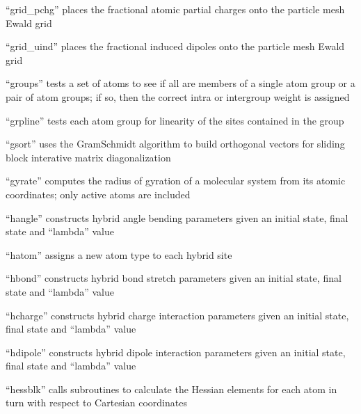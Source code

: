\documentclass[letterpaper,11pt,english]{sphinxmanual}
\begin{document}

“grid\_pchg” places the fractional atomic partial charges onto
the particle mesh Ewald grid


“grid\_uind” places the fractional induced dipoles onto the
particle mesh Ewald grid


“groups” tests a set of atoms to see if all are members of a
single atom group or a pair of atom groups; if so, then the
correct intra\sphinxhyphen{} or intergroup weight is assigned


“grpline” tests each atom group for linearity of the sites
contained in the group


“gsort” uses the Gram\sphinxhyphen{}Schmidt algorithm to build orthogonal
vectors for sliding block interative matrix diagonalization


“gyrate” computes the radius of gyration of a molecular system
from its atomic coordinates; only active atoms are included


“hangle” constructs hybrid angle bending parameters given
an initial state, final state and “lambda” value


“hatom” assigns a new atom type to each hybrid site


“hbond” constructs hybrid bond stretch parameters given
an initial state, final state and “lambda” value


“hcharge” constructs hybrid charge interaction parameters
given an initial state, final state and “lambda” value


“hdipole” constructs hybrid dipole interaction parameters
given an initial state, final state and “lambda” value


“hessblk” calls subroutines to calculate the Hessian elements
for each atom in turn with respect to Cartesian coordinates
\end{document}
